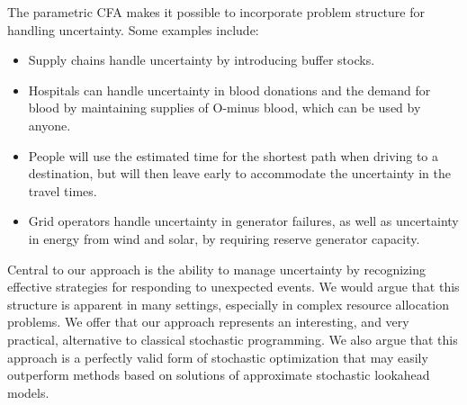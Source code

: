 \documentclass[11pt,oneside,fleqn,reqno,titlepage]{article}
\newcounter{example}
\begin{document}
The parametric CFA makes it possible to incorporate problem structure for handling uncertainty. Some examples include:
\begin{itemize}
\item Supply chains handle uncertainty by introducing buffer stocks.
\item Hospitals can handle uncertainty in blood donations and the demand for blood by maintaining supplies of O-minus blood, which can be used by anyone.
\item People will use the estimated time for the shortest path when driving to a destination, but will then leave early to accommodate the uncertainty in the travel times.
\item Grid operators handle uncertainty in generator failures, as well as uncertainty in energy from wind and solar, by requiring reserve generator capacity.
\end{itemize}
Central to our approach is the ability to manage uncertainty by recognizing effective strategies for responding to unexpected events.  We would argue that this structure is apparent in many settings, especially in complex resource allocation problems. We offer that our approach represents an interesting, and very practical, alternative to classical stochastic programming.  We also argue that this approach is a perfectly valid form of stochastic optimization that may easily outperform methods based on solutions of approximate stochastic lookahead models.

\end{document}
